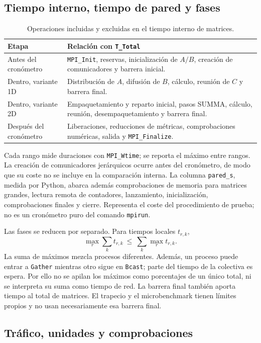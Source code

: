 \subsection{Tiempo interno, tiempo de pared y fases}

\begin{table}[H]\centering\small
\caption{Operaciones incluidas y excluidas en el tiempo interno de matrices.}
\begin{tabularx}{\linewidth}{p{3.5cm}X}
\toprule Etapa & Relación con \texttt{T\_Total} \\
\midrule
Antes del cronómetro & \texttt{MPI\_Init}, reservas, inicialización de $A/B$, creación de comunicadores y barrera inicial. \\
Dentro, variante 1D & Distribución de $A$, difusión de $B$, cálculo, reunión de $C$ y barrera final. \\
Dentro, variante 2D & Empaquetamiento y reparto inicial, pasos SUMMA, cálculo, reunión, desempaquetamiento y barrera final. \\
Después del cronómetro & Liberaciones, reducciones de métricas, comprobaciones numéricas, salida y \texttt{MPI\_Finalize}. \\
\bottomrule
\end{tabularx}
\end{table}

Cada rango mide duraciones con \texttt{MPI\_Wtime}; se reporta el máximo entre rangos. La creación de comunicadores jerárquicos ocurre antes del cronómetro, de modo que su coste no se incluye en la comparación interna. La columna \texttt{pared\_s}, medida por Python, abarca además comprobaciones de memoria para matrices grandes, lectura remota de contadores, lanzamiento, inicialización, comprobaciones finales y cierre. Representa el coste del procedimiento de prueba; no es un cronómetro puro del comando \texttt{mpirun}.

Las fases se reducen por separado. Para tiempos locales $t_{r,k}$,
\[
 \max_r\sum_k t_{r,k}\ \leq\ \sum_k\max_r t_{r,k}.
\]
La suma de máximos mezcla procesos diferentes. Además, un proceso puede entrar a \texttt{Gather} mientras otro sigue en \texttt{Bcast}; parte del tiempo de la colectiva es espera. Por ello no se apilan los máximos como porcentajes de un único total, ni se interpreta su suma como tiempo de red. La barrera final también aporta tiempo al total de matrices. El trapecio y el microbenchmark tienen límites propios y no usan necesariamente esa barrera final.

\subsection{Tráfico, unidades y comprobaciones}

